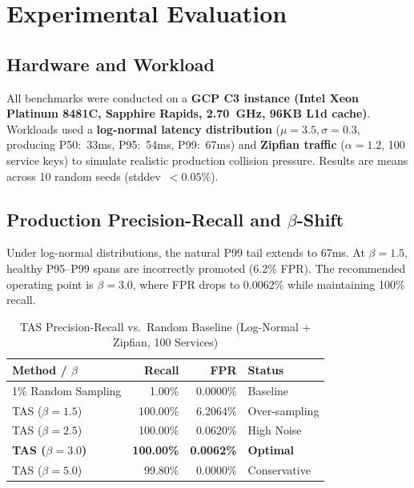 \documentclass[sigconf,nonacm]{acmart}
\begin{document}
\section{Experimental Evaluation}

\subsection{Hardware and Workload}

All benchmarks were conducted on a \textbf{GCP C3 instance (Intel Xeon Platinum 8481C,
Sapphire Rapids, 2.70~GHz, 96KB L1d cache)}. Workloads used a \textbf{log-normal latency
distribution} ($\mu=3.5, \sigma=0.3$, producing P50:~33ms, P95:~54ms, P99:~67ms) and
\textbf{Zipfian traffic} ($\alpha=1.2$, 100 service keys) to simulate realistic
production collision pressure. Results are means across 10 random seeds
(stddev~$<0.05\%$).

\subsection{Production Precision-Recall and $\beta$-Shift}

Under log-normal distributions, the natural P99 tail extends to 67ms. At $\beta=1.5$,
healthy P95--P99 spans are incorrectly promoted (6.2\% FPR). The recommended operating
point is $\beta=3.0$, where FPR drops to 0.0062\% while maintaining 100\% recall.

\begin{table}[h]
\caption{TAS Precision-Recall vs.\ Random Baseline (Log-Normal + Zipfian, 100 Services)}
\label{tab:precrecall}
\centering
\small
\begin{tabular}{l r r l}
\toprule
\textbf{Method / $\beta$} & \textbf{Recall} & \textbf{FPR} & \textbf{Status} \\
\midrule
1\% Random Sampling        & 1.00\%   & 0.0000\% & Baseline      \\
\midrule
TAS ($\beta=1.5$)          & 100.00\% & 6.2064\% & Over-sampling \\
TAS ($\beta=2.5$)          & 100.00\% & 0.0620\% & High Noise    \\
\textbf{TAS ($\beta=3.0$)} & \textbf{100.00\%} & \textbf{0.0062\%} & \textbf{Optimal} \\
TAS ($\beta=5.0$)          & 99.80\%  & 0.0000\% & Conservative  \\
\bottomrule
\end{tabular}
\end{table}
\end{document}
